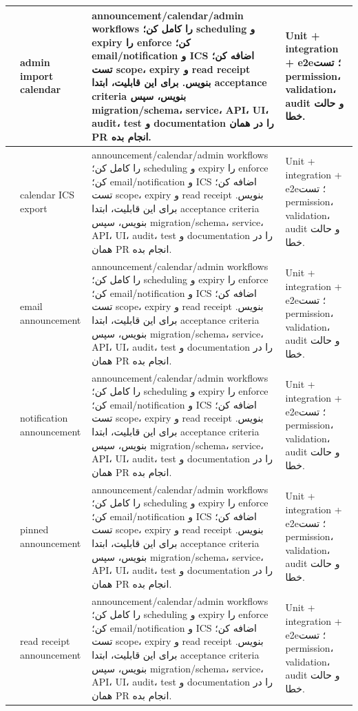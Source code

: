 \documentclass[11pt,a4paper]{article}
\begin{document}
\begin{longtable}{|>{\raggedleft\arraybackslash}p{}|>{\raggedleft\arraybackslash}p{}|>{\raggedleft\arraybackslash}p{}|>{\raggedleft\arraybackslash}p{}|}
292 & admin import calendar & announcement/calendar/admin workflows را کامل کن؛ scheduling و expiry را enforce کن؛ email/notification و ICS اضافه کن؛ تست scope، expiry و read receipt بنویس. برای این قابلیت، ابتدا acceptance criteria بنویس، سپس migration/schema، service، API، UI، audit، test و documentation را در همان PR انجام بده. & Unit + integration + e2e؛ تست permission، validation، audit و حالت خطا. \\ \hline
293 & calendar ICS export & announcement/calendar/admin workflows را کامل کن؛ scheduling و expiry را enforce کن؛ email/notification و ICS اضافه کن؛ تست scope، expiry و read receipt بنویس. برای این قابلیت، ابتدا acceptance criteria بنویس، سپس migration/schema، service، API، UI، audit، test و documentation را در همان PR انجام بده. & Unit + integration + e2e؛ تست permission، validation، audit و حالت خطا. \\ \hline
294 & email announcement & announcement/calendar/admin workflows را کامل کن؛ scheduling و expiry را enforce کن؛ email/notification و ICS اضافه کن؛ تست scope، expiry و read receipt بنویس. برای این قابلیت، ابتدا acceptance criteria بنویس، سپس migration/schema، service، API، UI، audit، test و documentation را در همان PR انجام بده. & Unit + integration + e2e؛ تست permission، validation، audit و حالت خطا. \\ \hline
295 & notification announcement & announcement/calendar/admin workflows را کامل کن؛ scheduling و expiry را enforce کن؛ email/notification و ICS اضافه کن؛ تست scope، expiry و read receipt بنویس. برای این قابلیت، ابتدا acceptance criteria بنویس، سپس migration/schema، service، API، UI، audit، test و documentation را در همان PR انجام بده. & Unit + integration + e2e؛ تست permission، validation، audit و حالت خطا. \\ \hline
296 & pinned announcement & announcement/calendar/admin workflows را کامل کن؛ scheduling و expiry را enforce کن؛ email/notification و ICS اضافه کن؛ تست scope، expiry و read receipt بنویس. برای این قابلیت، ابتدا acceptance criteria بنویس، سپس migration/schema، service، API، UI، audit، test و documentation را در همان PR انجام بده. & Unit + integration + e2e؛ تست permission، validation، audit و حالت خطا. \\ \hline
297 & read receipt announcement & announcement/calendar/admin workflows را کامل کن؛ scheduling و expiry را enforce کن؛ email/notification و ICS اضافه کن؛ تست scope، expiry و read receipt بنویس. برای این قابلیت، ابتدا acceptance criteria بنویس، سپس migration/schema، service، API، UI، audit، test و documentation را در همان PR انجام بده. & Unit + integration + e2e؛ تست permission، validation، audit و حالت خطا. \\ \hline

\end{longtable}
\end{document}
